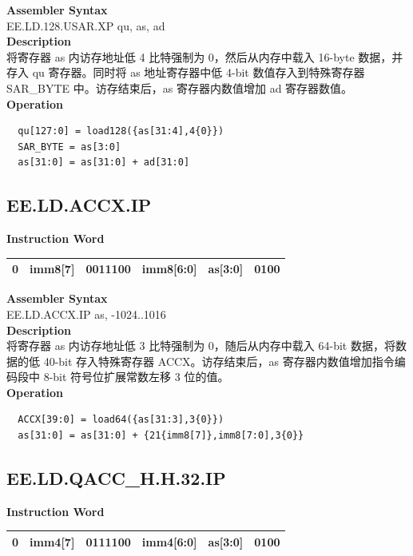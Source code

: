 \textbf{Assembler Syntax} \\
EE.LD.128.USAR.XP qu, as, ad \\
\textbf{Description} \\
将寄存器 as 内访存地址低 4 比特强制为 0，然后从内存中载入 16-byte 数据，并存入 qu 寄存器。同时将 as 地址寄存器中低 4-bit 数值存入到特殊寄存器 SAR\_BYTE 中。访存结束后，as 寄存器内数值增加 ad 寄存器数值。\\
\textbf{Operation}
\begin{lstlisting}
  qu[127:0] = load128({as[31:4],4{0}})
  SAR_BYTE = as[3:0]
  as[31:0] = as[31:0] + ad[31:0]
\end{lstlisting}

\clearpage
\subsection{EE.LD.ACCX.IP}\label{instruction:EELDACCXIP}
\setlength\tabcolsep{6pt}
\textbf{Instruction Word} \\
\begin{tabular}{|c|c|c|c|c|c|}
	\hline
	0 & imm8[7] & 0011100 & imm8[6:0] & as[3:0] & 0100 \\
	\hline
\end{tabular}

\textbf{Assembler Syntax} \\
EE.LD.ACCX.IP as, -1024..1016 \\
\textbf{Description} \\
将寄存器 as 内访存地址低 3 比特强制为 0，随后从内存中载入 64-bit 数据，将数据的低 40-bit 存入特殊寄存器 ACCX。访存结束后，as 寄存器内数值增加指令编码段中 8-bit 符号位扩展常数左移 3 位的值。\\
\textbf{Operation}
\begin{lstlisting}
  ACCX[39:0] = load64({as[31:3],3{0}})
  as[31:0] = as[31:0] + {21{imm8[7]},imm8[7:0],3{0}}
\end{lstlisting}

\clearpage
\subsection{EE.LD.QACC\_H.H.32.IP}\label{instruction:EELDQACCHH32IP}
\setlength\tabcolsep{6pt}
\textbf{Instruction Word} \\
\begin{tabular}{|c|c|c|c|c|c|}
	\hline
	0 & imm4[7] & 0111100 & imm4[6:0] & as[3:0] & 0100 \\
	\hline
\end{tabular}

